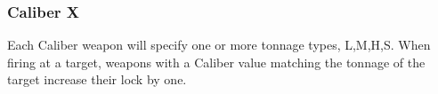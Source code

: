 \subsubsection{Caliber X}
Each Caliber weapon will specify one or more tonnage types, L,M,H,S. When firing at a target, weapons with a Caliber value matching the tonnage of the target increase their lock by one.
